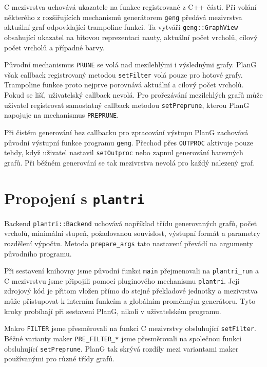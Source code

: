 C mezivrstva uchovává ukazatele na funkce registrované z C++ části. Při volání
některého z rozšiřujících mechanismů generátorem \texttt{geng} předává
mezivrstva aktuální graf odpovídající trampoline funkci. Ta vytváří
\texttt{geng::GraphView} obsahující ukazatel na bitovou reprezentaci nauty,
aktuální počet vrcholů, cílový počet vrcholů a případné barvy.

Původní mechanismus \texttt{PRUNE} se volá nad mezilehlými i výslednými grafy.
PlanG však callback registrovaný metodou \texttt{setFilter} volá pouze pro
hotové grafy. Trampoline funkce proto nejprve porovnává aktuální a cílový počet
vrcholů. Pokud se liší, uživatelský callback nevolá. Pro prořezávání
mezilehlých grafů může uživatel registrovat samostatný callback metodou
\texttt{setPreprune}, kterou PlanG napojuje na mechanismus \texttt{PREPRUNE}.

Při čistém generování bez callbacku pro zpracování výstupu PlanG zachovává
původní výstupní funkce programu \texttt{geng}. Přechod přes \texttt{OUTPROC}
aktivuje pouze tehdy, když uživatel nastavil \texttt{setOutproc} nebo zapnul
generování barevných grafů. Při běžném generování se tak mezivrstva nevolá pro
každý nalezený graf.

\section{Propojení s \texttt{plantri}}
\label{sec:implementation-plantri}

Backend \texttt{plantri::Backend} uchovává například třídu generovaných grafů,
počet vrcholů, minimální stupeň, požadovanou souvislost, výstupní formát a
parametry rozdělení výpočtu. Metoda \texttt{prepare\_args} tato nastavení
převádí na argumenty původního programu.

Při sestavení knihovny jsme původní funkci \texttt{main} přejmenovali na
\texttt{plantri\_run} a C mezivrstvu jsme připojili pomocí pluginového
mechanismu \texttt{plantri}. Její zdrojový kód je přitom vložen přímo do stejné
překladové jednotky a mezivrstva může přistupovat k interním funkcím a
globálním proměnným generátoru. Tyto kroky probíhají při sestavení PlanG,
nikoli v uživatelském programu.

Makro \texttt{FILTER} jsme přesměrovali na funkci C mezivrstvy obsluhující
\texttt{setFilter}. Běžné varianty maker \texttt{PRE\_FILTER\_*} jsme
přesměrovali na společnou funkci obsluhující \texttt{setPreprune}. PlanG tak
skrývá rozdíly mezi variantami maker používanými pro různé třídy grafů.

